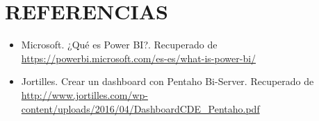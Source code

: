 \documentclass[12pt,letterpaper]{article}
\begin{document}
\section{REFERENCIAS}
\begin{itemize}
	\item Microsoft. ¿Qué es Power BI?. Recuperado de \url{https://powerbi.microsoft.com/es-es/what-is-power-bi/}
	\item Jortilles. Crear un dashboard con Pentaho Bi-Server. Recuperado de \url{http://www.jortilles.com/wp-content/uploads/2016/04/DashboardCDE_Pentaho.pdf}

\end{itemize}
\end{document}
